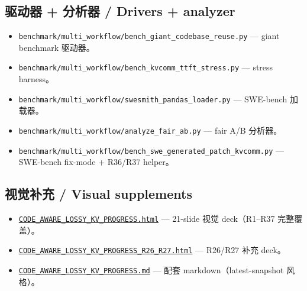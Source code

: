 \documentclass[11pt,a4paper]{article}
\begin{document}
\subsection*{驱动器 + 分析器 / Drivers + analyzer}
\begin{itemize}
  \item \texttt{benchmark/multi\_workflow/bench\_giant\_codebase\_reuse.py} --- giant benchmark 驱动器。
  \item \texttt{benchmark/multi\_workflow/bench\_kvcomm\_ttft\_stress.py} --- stress harness。
  \item \texttt{benchmark/multi\_workflow/swesmith\_pandas\_loader.py} --- SWE-bench 加载器。
  \item \texttt{benchmark/multi\_workflow/analyze\_fair\_ab.py} --- fair A/B 分析器。
  \item \texttt{benchmark/multi\_workflow/bench\_swe\_generated\_patch\_kvcomm.py} --- SWE-bench fix-mode + R36/R37 helper。
\end{itemize}

\subsection*{视觉补充 / Visual supplements}
\begin{itemize}
  \item \href{file:../results/CODE_AWARE_LOSSY_KV_PROGRESS.html}{\texttt{CODE\_AWARE\_LOSSY\_KV\_PROGRESS.html}} --- 21-slide 视觉 deck（R1--R37 完整覆盖）。
  \item \href{file:../results/CODE_AWARE_LOSSY_KV_PROGRESS_R26_R27.html}{\texttt{CODE\_AWARE\_LOSSY\_KV\_PROGRESS\_R26\_R27.html}} --- R26/R27 补充 deck。
  \item \href{file:../results/CODE_AWARE_LOSSY_KV_PROGRESS.md}{\texttt{CODE\_AWARE\_LOSSY\_KV\_PROGRESS.md}} --- 配套 markdown（latest-snapshot 风格）。
\end{itemize}
\end{document}
